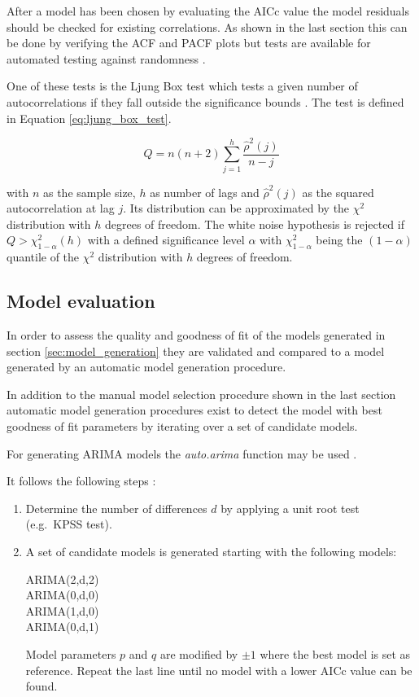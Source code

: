 After a model has been chosen by evaluating the AICc value the model residuals should be checked for existing correlations. As shown in the last section this can be done by verifying the ACF and PACF plots but tests are available for automated testing against randomness \cite{weron2007modeling,hyndman2012forecasting}. 

One of these tests is the Ljung Box test which tests a given number of autocorrelations if they fall outside the significance bounds \cite{weron2007modeling}. The test is defined in Equation \ref{eq:ljung_box_test}. 

\begin{equation}
	Q = n(n + 2) \sum_{j=1}^{h} \frac{\hat{\rho}^2 (j)}{n - j}
\label{eq:ljung_box_test}
\end{equation}

with $n$ as the sample size, $h$ as number of lags and $\hat{\rho}^2 (j)$ as the squared autocorrelation at lag $j$. 
Its distribution can be approximated by the $\chi^2$ distribution with $h$ degrees of freedom. The white noise hypothesis is rejected if $Q > \chi_{1-\alpha}^2 (h)$ with a defined significance level $\alpha$ with $\chi_{1-\alpha}^2$ being the $(1 - \alpha)$ quantile of the $\chi^2$ distribution with $h$ degrees of freedom. 


\subsection{Model evaluation}

In order to assess the quality and goodness of fit of the models generated in section \ref{sec:model_generation} they are validated and compared to a model generated by an automatic model generation procedure. 

In addition to the manual model selection procedure shown in the last section automatic model generation procedures exist to detect the model with best goodness of fit parameters by iterating over a set of candidate models. 

For generating ARIMA models the \textit{auto.arima} function may be used \cite{hyndman2012forecasting,r2016language}. 

It follows the following steps \cite{hyndman2012forecasting}: 

\begin{enumerate}
	\item Determine the number of differences $d$ by applying a unit root test (e.g.~KPSS test).
	\item A set of candidate models is generated starting with the following models: 
				
				ARIMA(2,d,2) \\
				ARIMA(0,d,0) \\
				ARIMA(1,d,0) \\
				ARIMA(0,d,1) 
				
				Model parameters $p$ and $q$ are modified by $\pm 1$ where the best model is set as reference. 
				Repeat the last line until no model with a lower AICc value can be found. 

\end{enumerate}

